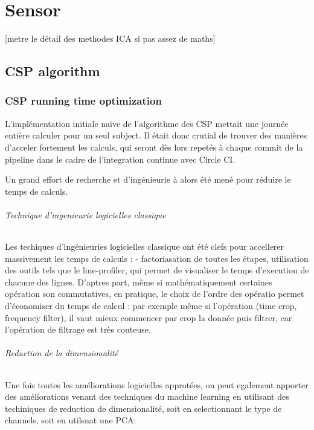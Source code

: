 
\chapter{Sensor}

[metre le détail des methodes ICA si pas assez de maths]

\section{CSP algorithm}

\subsection{CSP running time optimization}
\label{Sec:running_time_optimisation}

L'implémentation initiale naïve de l'algorithme des CSP mettait une journée entière calculer pour un seul subject. Il était donc crutial de trouver des manières d'acceler fortement les calculs, qui seront dès lors repetés à chaque commit de la pipeline dans le cadre de l'integration continue avec Circle CI.

Un grand effort de recherche et d'ingénieurie à alors été mené pour réduire le temps de calculs.

\subparagraph{Technique d'ingenieurie logicielles classique}

Les techiques d'ingénieuries logicielles classique ont été clefs pour accellerer massivement les temps de calculs : - factoriasation de toutes les étapes, utilisation des outils tels que le line-profiler, qui permet de visualiser le temps d'execution de chacune des lignes. D'aptres part, même si mathématiquement certaines opération son commutatives, en pratique, le choix de l'ordre des opératio permet d'économiser du temps de calcul : par exemple même si l'opération (time crop, frequency filter), il vaut mieux commencer par crop la donnée puis filtrer, car l'opération de filtrage est très couteuse.


\subparagraph{Reduction de la dimensionalité}

Une fois toutes les améliorations logicielles approtées, on peut egalement apporter des améliorations venant des techniques du machine learning en utilisant des techiniques de reduction de dimensionalité, soit en selectionnant le type de channels, soit en utilsnat une PCA:

